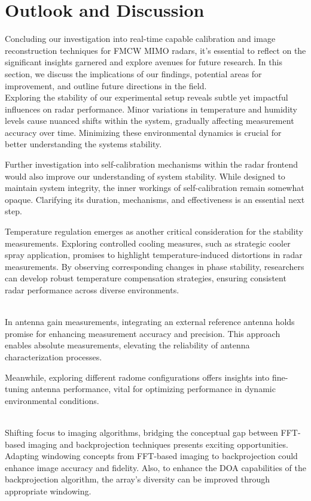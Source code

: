 \section{Outlook and Discussion}

Concluding our investigation into real-time capable calibration and image reconstruction techniques for FMCW MIMO radars,
it's essential to reflect on the significant insights garnered and explore avenues for future research.
In this section, we discuss the implications of our findings, potential areas for improvement,
and outline future directions in the field.
\\

Exploring the stability of our experimental setup reveals subtle yet impactful influences on radar performance.
Minor variations in temperature and humidity levels cause nuanced shifts within the system, 
gradually affecting measurement accuracy over time.
Minimizing these environmental dynamics is crucial for better understanding the systems stability.

Further investigation into self-calibration mechanisms within the radar frontend would also improve our understanding of system stability.
While designed to maintain system integrity, the inner workings of self-calibration remain somewhat opaque.
Clarifying its duration, mechanisms, and effectiveness is an essential next step.

Temperature regulation emerges as another critical consideration for the stability measurements.
Exploring controlled cooling measures, such as strategic cooler spray application, 
promises to highlight temperature-induced distortions in radar measurements.
By observing corresponding changes in phase stability, 
researchers can develop robust temperature compensation strategies, 
ensuring consistent radar performance across diverse environments.

\\
In antenna gain measurements, integrating an external reference antenna
holds promise for enhancing measurement accuracy and precision.
This approach enables absolute measurements, elevating the reliability of antenna characterization processes.

Meanwhile, exploring different radome configurations offers insights into fine-tuning antenna performance, 
vital for optimizing performance in dynamic environmental conditions.

\\
Shifting focus to imaging algorithms, bridging the conceptual gap between FFT-based imaging and 
backprojection techniques presents exciting opportunities.
Adapting windowing concepts from FFT-based imaging to backprojection could enhance image accuracy and fidelity.
Also, to enhance the DOA capabilities of the backprojection algorithm,
the array's diversity can be improved through appropriate windowing.

